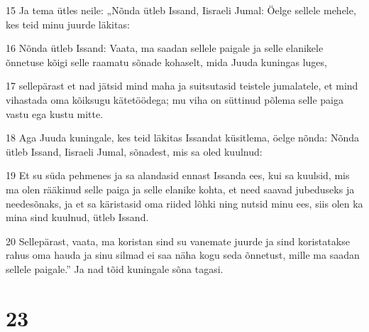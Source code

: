 \par 15 Ja tema ütles neile: „Nõnda ütleb Issand, Iisraeli Jumal: Öelge sellele mehele, kes teid minu juurde läkitas:
\par 16 Nõnda ütleb Issand: Vaata, ma saadan sellele paigale ja selle elanikele õnnetuse kõigi selle raamatu sõnade kohaselt, mida Juuda kuningas luges,
\par 17 sellepärast et nad jätsid mind maha ja suitsutasid teistele jumalatele, et mind vihastada oma kõiksugu kätetöödega; mu viha on süttinud põlema selle paiga vastu ega kustu mitte.
\par 18 Aga Juuda kuningale, kes teid läkitas Issandat küsitlema, öelge nõnda: Nõnda ütleb Issand, Iisraeli Jumal, sõnadest, mis sa oled kuulnud:
\par 19 Et su süda pehmenes ja sa alandasid ennast Issanda ees, kui sa kuulsid, mis ma olen rääkinud selle paiga ja selle elanike kohta, et need saavad jubeduseks ja needesõnaks, ja et sa käristasid oma riided lõhki ning nutsid minu ees, siis olen ka mina sind kuulnud, ütleb Issand.
\par 20 Sellepärast, vaata, ma koristan sind su vanemate juurde ja sind koristatakse rahus oma hauda ja sinu silmad ei saa näha kogu seda õnnetust, mille ma saadan sellele paigale.” Ja nad tõid kuningale sõna tagasi.

\chapter{23}

